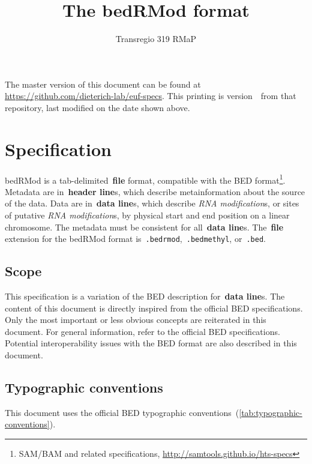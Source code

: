 \documentclass[11pt]{article}
\title{The \acf{bedRMod} format}
\author{Transregio 319 RMaP}
\date{\headdate}
\providecommand*{\Ac}[1]{\ac{#1}} %
\begin{document}
\maketitle

\begin{small}
\noindent
The master version of this document can be found at \url{https://github.com/dieterich-lab/euf-specs}.
This printing is version~\commitdesc\ from that repository, last modified on the date shown above.
\end{small}


\section{Specification}

\Ac{bedRMod} is a tab-delimited~\textbf{file} format, compatible with the \acf{BED} format\footnote{SAM/BAM and related specifications, \url{http://samtools.github.io/hts-specs}}. Metadata are in~\textbf{header line}s, which describe metainformation about the source of the data. Data are in~\textbf{data line}s, which describe \emph{RNA modification}s, or sites of putative \emph{RNA modification}s, by physical start and end position on a linear chromosome. The metadata must be consistent for all~\textbf{data line}s. The~\textbf{file} extension for the \ac{bedRMod} format is~\texttt{.bedrmod},~\texttt{.bedmethyl}, or~\texttt{.bed}.

\subsection{Scope}

This specification is a variation of the \ac{BED} description for~\textbf{data line}s. The content of this document is directly inspired from the 
official \ac{BED} specifications. Only the most important or less obvious concepts are reiterated in this document. For general information, refer to the official \ac{BED} specifications. Potential interoperability issues with the \ac{BED} format are also described in this document.

\subsection{Typographic conventions}

This document uses the official \ac{BED} typographic conventions~(\autoref{tab:typographic-conventions}).
\end{document}

